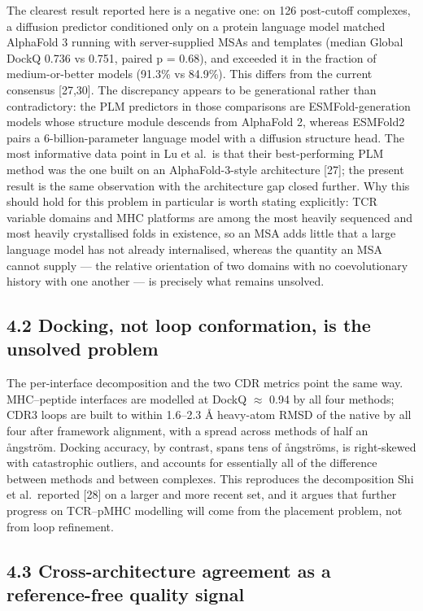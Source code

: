 \documentclass[
  11pt,
]{article}
\begin{document}
The clearest result reported here is a negative one: on 126 post-cutoff
complexes, a diffusion predictor conditioned only on a protein language
model matched AlphaFold 3 running with server-supplied MSAs and
templates (median Global DockQ 0.736 vs 0.751, paired p = 0.68), and
exceeded it in the fraction of medium-or-better models (91.3\% vs
84.9\%). This differs from the current consensus {[}27,30{]}. The
discrepancy appears to be generational rather than contradictory: the
PLM predictors in those comparisons are ESMFold-generation models whose
structure module descends from AlphaFold 2, whereas ESMFold2 pairs a
6-billion-parameter language model with a diffusion structure head. The
most informative data point in Lu et al.~is that their best-performing
PLM method was the one built on an AlphaFold-3-style architecture
{[}27{]}; the present result is the same observation with the
architecture gap closed further. Why this should hold for this problem
in particular is worth stating explicitly: TCR variable domains and MHC
platforms are among the most heavily sequenced and most heavily
crystallised folds in existence, so an MSA adds little that a large
language model has not already internalised, whereas the quantity an MSA
cannot supply --- the relative orientation of two domains with no
coevolutionary history with one another --- is precisely what remains
unsolved.

\subsection{4.2 Docking, not loop conformation, is the unsolved
problem}\label{docking-not-loop-conformation-is-the-unsolved-problem}

The per-interface decomposition and the two CDR metrics point the same
way. MHC--peptide interfaces are modelled at DockQ \ensuremath{\approx} 0.94 by all four
methods; CDR3 loops are built to within 1.6--2.3 \AA{} heavy-atom RMSD of
the native by all four after framework alignment, with a spread across
methods of half an \aa{}ngström. Docking accuracy, by contrast, spans tens
of \aa{}ngströms, is right-skewed with catastrophic outliers, and accounts
for essentially all of the difference between methods and between
complexes. This reproduces the decomposition Shi et al.~reported
{[}28{]} on a larger and more recent set, and it argues that further
progress on TCR--pMHC modelling will come from the placement problem,
not from loop refinement.

\subsection{4.3 Cross-architecture agreement as a reference-free quality
signal}\label{cross-architecture-agreement-as-a-reference-free-quality-signal}
\end{document}

